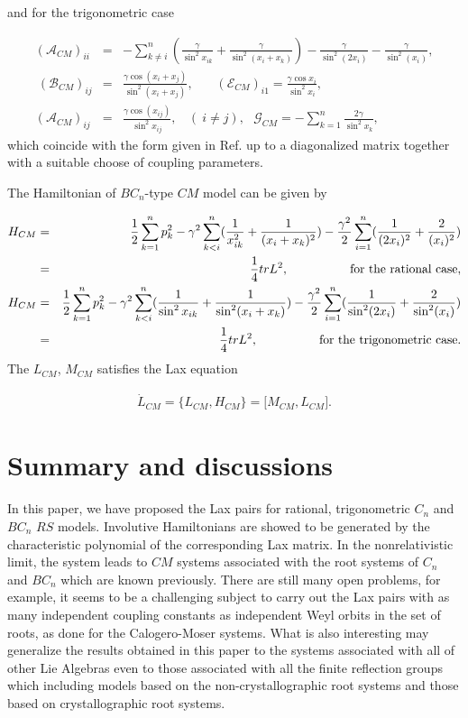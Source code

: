 \documentclass[a4paper,12pt]{article}
\newcommand{\sect}[1]{\setcounter{equation}{0}\section{#1}}
\begin{document}
\noindent and for the trigonometric case

\begin{eqnarray}
(\mathcal{A}_{CM})_{ii} &=&-\sum_{k\neq i}^{n}(\frac{\gamma }{\sin ^{2}x_{ik}%
}+\frac{\gamma }{\sin ^{2}(x_{i}+x_{k})})-\frac{\gamma }{\sin ^{2}(2x_{i})}-%
\frac{\gamma }{\sin ^{2}(x_{i})},  \nonumber \\
\ (\mathcal{B}_{CM})_{ij} &=&\frac{\gamma \cos (x_{i}+x_{j})}{\sin
^{2}(x_{i}+x_{j})},\ \ \ \ \ \ \ \ (\mathcal{E}_{CM})_{i1}=\frac{\gamma \cos
x_{i}}{\sin ^{2}x_{i}},	 \nonumber \\
(\mathcal{A}_{CM})_{ij} &=&\frac{\gamma \cos (x_{ij})}{\sin ^{2}x_{ij}},\ \
\ \ (\ i\neq j),\ \ \ \mathcal{G}_{CM}=-\sum_{k=1}^{n}\frac{2\gamma }{\sin
^{2}x_{k}},
\end{eqnarray}
which coincide with the form given in Ref. \cite{op} up to a diagonalized matrix
together with a suitable choose of coupling parameters.

The Hamiltonian of $BC_{n}$-type $CM$ model can be given by

\begin{eqnarray}
H_{CM} &=&\frac{1}{2}\sum_{k=1}^{n}p_{k}^{2}-\gamma ^{2}\sum_{k<i}^{n}(\frac{%
1}{x_{ik}^{2}}+\frac{1}{(x_{i}+x_{k})^{2}})-\frac{\gamma ^{2}}{2}%
\sum_{i=1}^{n}(\frac{1}{(2x_{i})^{2}}+\frac{2}{(x_{i})^{2}})  \nonumber \\
&=&\frac{1}{4}trL^{2},\ \ \ \ \ \ \ \ \ \ \ \ \ \ \
\mbox{for the rational
case}, \\
H_{CM} &=&\frac{1}{2}\sum_{k=1}^{n}p_{k}^{2}-\gamma ^{2}\sum_{k<i}^{n}(\frac{%
1}{\sin ^{2}x_{ik}}+\frac{1}{\sin ^{2}(x_{i}+x_{k})})-\frac{\gamma ^{2}}{2}%
\sum_{i=1}^{n}(\frac{1}{\sin ^{2}(2x_{i})}+\frac{2}{\sin ^{2}(x_{i})})
\nonumber \\
&=&\frac{1}{4}trL^{2},\ \ \ \ \ \ \ \ \ \ \ \ \ \ \
\mbox{for the trigonometric
case}.
\end{eqnarray}
The $L_{CM}$, $M_{CM}$ satisfies the Lax equation

\begin{eqnarray}
\dot{L}_{CM}=\{L_{CM},H_{CM}\}=\lbrack M_{CM},L_{CM}\rbrack .
\end{eqnarray}

\sect{Summary and discussions}
\label{sum}
In this paper, we have proposed
the Lax pairs for rational, trigonometric $C_{n}$ and $BC_{n}$ $RS$ models.
Involutive Hamiltonians are showed to be generated by the characteristic
polynomial of the corresponding Lax matrix. In the nonrelativistic limit,
the system leads to $CM$ systems associated with the root systems of $C_{n}$
and $BC_{n}$ which are known previously. There are still many open problems,
for example, it seems to be a challenging subject to carry out the Lax pairs
with as many independent coupling constants as independent Weyl orbits in
the set of roots, as done for the Calogero-Moser systems\cite
{op,bcs,bcs2,bcs3,bcs1,hp1}. What is also interesting may generalize the
results obtained in this paper to the systems associated with all of other
Lie Algebras even to those associated with all the finite reflection groups%
\cite{bcs1} which including models based on the non-crystallographic root
systems and those based on crystallographic root systems.
\end{document}
